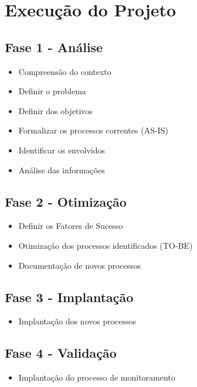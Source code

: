 \section{Execução do Projeto}
\subsection{Fase 1 - Análise}
\begin{itemize}[noitemsep]
	\item Compreensão do contexto
	\item Definir o problema
	\item Definir dos objetivos
	\item Formalizar os processos correntes (AS-IS)
	\item Identificar os envolvidos
	\item Análise das informações
\end{itemize}
\subsection{Fase 2 - Otimização}
\begin{itemize}[noitemsep]
	\item Definir os Fatores de Sucesso
	\item Otimização dos processos identificados (TO-BE)
	\item Documentação de novos processos
\end{itemize}
\subsection{Fase 3 - Implantação}
\begin{itemize}[noitemsep]
	\item  Implantação dos novos processos
\end{itemize}

\subsection{Fase 4 - Validação}
\begin{itemize}[noitemsep]
	\item Implantação do processo de monitoramento
\end{itemize}
